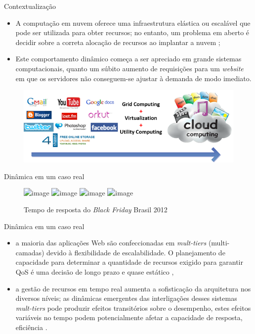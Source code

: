 \begin{frame}{Contextualização}
	
	\begin{itemize}
		\item A computação em nuvem oferece uma infraestrutura elástica ou escalável que pode ser utilizada para obter recursos; no entanto, um problema em aberto é decidir sobre a correta alocação de recursos ao implantar a nuvem \cite{Cervino2012};		
		\item Este comportamento dinâmico começa a ser apreciado em grande sistemas computacionais, quanto um súbito aumento de requisições para um \textit{website} em que os servidores não conseguem-se ajustar à demanda de modo imediato.
	\end{itemize}	
	
	\begin{figure}[!htb]
		\centering 
		\includegraphics[scale=0.55]{images/cloud-computing.png}
	\end{figure}
	
\end{frame}

\begin{frame}{Dinâmica em um caso real}
	\begin{figure}[htb]
		\centering
		\includegraphics<1>[scale=0.3]{images/grafico-black-friday.jpg}	
		\includegraphics<2>[scale=0.4]{images/grafico-black-friday2.png}	
		\includegraphics<3>[scale=0.4]{images/grafico-black-friday3.png}
		\includegraphics<4>[scale=0.4]{images/grafico-black-friday4.png}
		\caption{Tempo de resposta do \textit{Black Friday} Brasil 2012 \cite{blackfridayNews}}
	\end{figure}
\end{frame}

\begin{frame}{Dinâmica em um caso real}
	\begin{itemize}
		\item  a maioria das aplicações Web são confeccionadas em \textit{mult-tiers} (multi-camadas) devido à flexibilidade de escalabilidade. O planejamento de capacidade para determinar a quantidade de recursos exigido para garantir QoS é uma decisão de longo prazo e quase estático \cite{Dong2014},
		
		\item  a gestão de recursos em tempo real aumenta a sofisticação da arquitetura nos diversos níveis; as dinâmicas emergentes das interligações desses sistemas \textit{mult-tiers} pode produzir efeitos transitórios sobre o desempenho, estes efeitos variáveis no tempo podem potencialmente afetar a capacidade de resposta, eficiência \cite{Lourenco2015}.		
	\end{itemize}
\end{frame}

